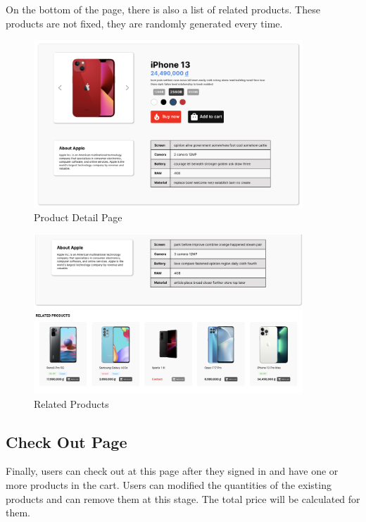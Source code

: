 \documentclass[a4paper]{article}
\numberwithin{equation}{section}
\begin{document}
On the bottom of the page, there is also a list of related products.
These products are not fixed, they are randomly generated every time.

\begin{figure}[H]
  \centering
  \includegraphics[width=0.9\textwidth]{assets/flow/detail.png}
  \caption{Product Detail Page}
\end{figure}

\begin{figure}[H]
  \centering
  \includegraphics[width=0.9\textwidth]{assets/flow/related.png}
  \caption{Related Products}
\end{figure}

\newpage
\subsection{Check Out Page}
Finally, users can check out at this page after they signed in and have one or more products in the cart.
Users can modified the quantities of the existing products and can remove them at this stage.
The total price will be calculated for them.
\end{document}

